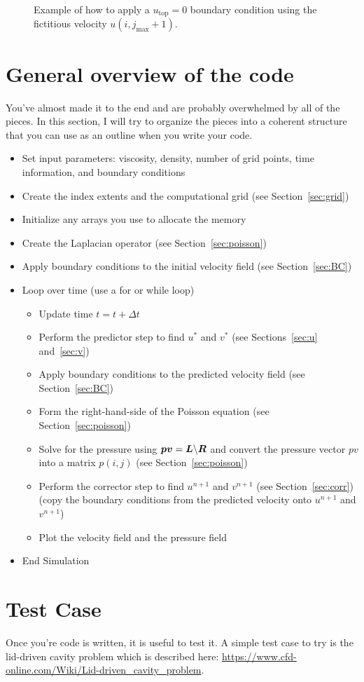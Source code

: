 \documentclass[]{article}
\def\bm#1{\mbox{\boldmath{$#1$}}}
\begin{document}
\begin{figure}[H]
  \centering
  \caption{Example of how to apply a $u_\text{top}=0$ boundary condition using the fictitious velocity $u(i,j_\text{max}+1)$.}
  \label{fig:BC}
\end{figure}

\newpage
\section{General overview of the code}
You've almost made it to the end and are probably overwhelmed by all of the pieces.  In this section, I will try to organize the pieces into a coherent structure that you can use as an outline when you write your code.
\begin{itemize}
\item Set input parameters: viscosity, density, number of grid points, time information, and boundary conditions
\item Create the index extents and the computational grid (see Section~\ref{sec:grid})
\item Initialize any arrays you use to allocate the memory 
\item Create the Laplacian operator (see Section~\ref{sec:poisson})
\item Apply boundary conditions to the initial velocity field (see Section~\ref{sec:BC})
\item Loop over time (use a for or while loop)
  \begin{itemize}
  \item Update time $t=t+\Delta t$
  \item Perform the predictor step to find $u^*$ and $v^*$ (see Sections~\ref{sec:u} and~\ref{sec:v})
  \item Apply boundary conditions to the predicted velocity field (see Section~\ref{sec:BC})
  \item Form the right-hand-side of the Poisson equation (see Section~\ref{sec:poisson})
  \item Solve for the pressure using $\bm{pv}=\bm{L}\backslash \bm{R}$ and convert the pressure vector $pv$ into a matrix $p(i,j)$ (see Section~\ref{sec:poisson})
  \item Perform the corrector step to find $u^{n+1}$ and $v^{n+1}$ (see Section~\ref{sec:corr}) (copy the boundary conditions from the predicted velocity onto $u^{n+1}$ and $v^{n+1}$)
  \item Plot the velocity field and the pressure field
  \end{itemize}
\item End Simulation
\end{itemize}

\section{Test Case}
Once you're code is written, it is useful to test it.  A simple test case to try is the lid-driven cavity problem which is described here: \url{https://www.cfd-online.com/Wiki/Lid-driven_cavity_problem}.
\end{document}

